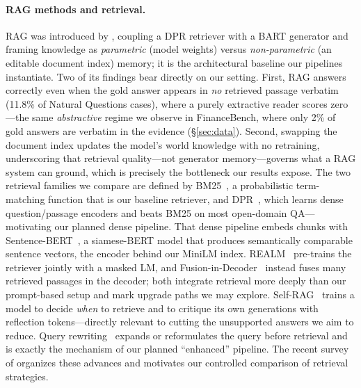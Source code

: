 \documentclass[11pt]{article}
\begin{document}
\paragraph{RAG methods and retrieval.}
RAG was introduced by \citet{lewis2020rag}, coupling a DPR retriever with a BART
generator and framing knowledge as \emph{parametric} (model weights) versus
\emph{non-parametric} (an editable document index) memory; it is the
architectural baseline our pipelines instantiate. Two of its findings bear
directly on our setting. First, RAG answers correctly even when the gold answer
appears in \emph{no} retrieved passage verbatim (11.8\% of Natural Questions
cases), where a purely extractive reader scores zero---the same
\emph{abstractive} regime we observe in FinanceBench, where only 2\% of gold
answers are verbatim in the evidence (\S\ref{sec:data}). Second, swapping the
document index updates the model's world knowledge with no retraining,
underscoring that retrieval quality---not generator memory---governs what a RAG
system can ground, which is precisely the bottleneck our results expose.
The two retrieval families we compare are defined by
BM25~\citep{robertson2009bm25}, a probabilistic term-matching function that is
our baseline retriever, and DPR~\citep{karpukhin2020dpr}, which learns dense
question/passage encoders and beats BM25 on most open-domain QA---motivating our
planned dense pipeline. That dense pipeline embeds chunks with
Sentence-BERT~\citep{reimers2019sbert}, a siamese-BERT model that produces
semantically comparable sentence vectors, the encoder behind our MiniLM index.
REALM~\citep{guu2020realm} pre-trains the retriever jointly with a masked LM, and
Fusion-in-Decoder~\citep{izacard2021fid} instead fuses many retrieved passages in
the decoder; both integrate retrieval more deeply than our prompt-based setup and
mark upgrade paths we may explore.
Self-RAG~\citep{asai2024selfrag} trains a model to decide \emph{when} to retrieve
and to critique its own generations with reflection tokens---directly relevant to
cutting the unsupported answers we aim to reduce.
Query rewriting~\citep{ma2023queryrewriting} expands or reformulates the query
before retrieval and is exactly the mechanism of our planned ``enhanced''
pipeline. The recent survey of \citet{gao2023ragsurvey} organizes these advances
and motivates our controlled comparison of retrieval strategies.
\end{document}
